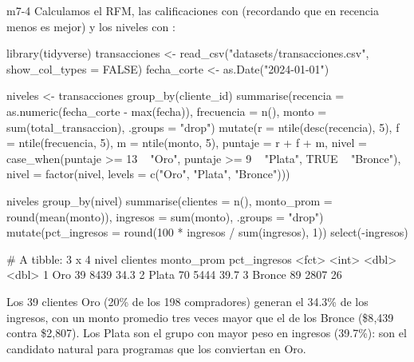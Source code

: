\begin{solucion}{m7-4}
Calculamos el RFM, las calificaciones con  (recordando que en
recencia menos es mejor) y los niveles con :

\begin{rcode}
library(tidyverse)
transacciones <- read_csv("datasets/transacciones.csv",
                          show_col_types = FALSE)
fecha_corte <- as.Date("2024-01-01")

niveles <- transacciones %
  group_by(cliente_id) %
  summarise(recencia   = as.numeric(fecha_corte - max(fecha)),
            frecuencia = n(),
            monto      = sum(total_transaccion), .groups = "drop") %
  mutate(r = ntile(desc(recencia), 5),
         f = ntile(frecuencia, 5),
         m = ntile(monto, 5),
         puntaje = r + f + m,
         nivel = case_when(puntaje >= 13 ~ "Oro",
                           puntaje >= 9  ~ "Plata",
                           TRUE          ~ "Bronce"),
         nivel = factor(nivel, levels = c("Oro", "Plata", "Bronce")))

niveles %
  group_by(nivel) %
  summarise(clientes = n(),
            monto_prom = round(mean(monto)),
            ingresos = sum(monto), .groups = "drop") %
  mutate(pct_ingresos = round(100 * ingresos / sum(ingresos), 1)) %
  select(-ingresos)
\end{rcode}

\begin{rsalida}
# A tibble: 3 x 4
  nivel  clientes monto_prom pct_ingresos
  <fct>     <int>      <dbl>        <dbl>
1 Oro          39       8439         34.3
2 Plata        70       5444         39.7
3 Bronce       89       2807         26  
\end{rsalida}

Los 39 clientes Oro (20\% de los 198 compradores) generan el 34.3\% de los
ingresos, con un monto promedio tres veces mayor que el de los Bronce (\$8{,}439
contra \$2{,}807). Los Plata son el grupo con mayor peso en ingresos
(39.7\%): son el candidato natural para programas que los conviertan en Oro.
\end{solucion}

